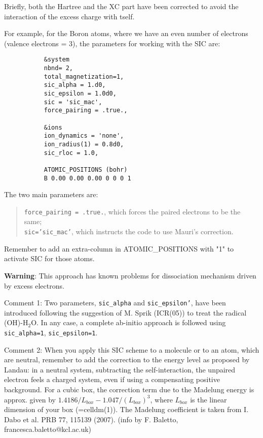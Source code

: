 \documentclass[12pt,a4paper]{article}
\begin{document}
Briefly, both the Hartree and the XC part have been 
corrected to avoid the interaction of the excess charge with tself.

For example, for the Boron atoms, where we have an even number of 
electrons (valence electrons = 3), the parameters for working with
the SIC are:
\begin{verbatim}
           &system
           nbnd= 2,
           total_magnetization=1,
           sic_alpha = 1.d0,
           sic_epsilon = 1.0d0,
           sic = 'sic_mac',
           force_pairing = .true.,

           &ions
           ion_dynamics = 'none',
           ion_radius(1) = 0.8d0,
           sic_rloc = 1.0,

           ATOMIC_POSITIONS (bohr)
           B 0.00 0.00 0.00 0 0 0 1
\end{verbatim}
The two main parameters are:
\begin{quote}
\texttt{force\_pairing = .true.}, which forces the paired electrons to be the same;\\ 
\texttt{sic='sic\_mac'}, which instructs the code to use Mauri's correction.
\end{quote}
Remember to add an extra-column in ATOMIC\_POSITIONS with "1" to activate
SIC for those atoms.

{\bf Warning}: 
This approach has known problems for dissociation mechanism
driven by excess electrons.

Comment 1:
Two parameters, \texttt{sic\_alpha} and \texttt{sic\_epsilon'}, have been introduced 
following the suggestion of M. Sprik (ICR(05)) to treat the radical
(OH)-H$_2$O. In any case, a complete ab-initio approach is followed 
using \texttt{sic\_alpha=1}, \texttt{sic\_epsilon=1}.

Comment 2:
When you apply this SIC scheme to a molecule or to an atom, which are neutral,
remember to add the correction to the energy level as proposed by Landau: 
in a neutral system, subtracting the self-interaction, the unpaired electron
feels a charged system, even if using a compensating positive background. 
For a cubic box, the correction term due to the Madelung energy is approx. 
given by $1.4186/L_{box} - 1.047/(L_{box})^3$, where $L_{box}$ is the 
linear dimension of your box (=celldm(1)). The Madelung coefficient is 
taken from I. Dabo et al. PRB 77, 115139 (2007).
(info by F. Baletto, francesca.baletto@kcl.ac.uk)

\end{document}
